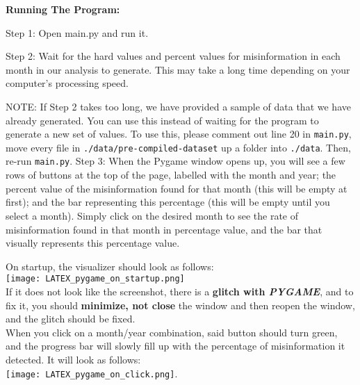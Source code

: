 \documentclass[fontsize=11pt]{article}
\begin{document}
\begin{flushleft}
        \textbf{Running The Program:}

        Step 1: Open main.py and run it.
        \hfill\break

        Step 2: Wait for the hard values and percent values for misinformation in each month in our analysis to generate. This may take a long time depending on your computer's processing speed.
        \hfill\break

        NOTE: If Step 2 takes too long, we have provided a sample of data that we have already generated. You can use this instead of waiting for the program to generate a new set of values. To use this, please comment out line 20 in \texttt{main.py}, move every file in \texttt{./data/pre-compiled-dataset} up a folder into \texttt{./data}. Then, re-run \texttt{main.py}.
        \hfill\break
        \newpage
        Step 3: When the Pygame window opens up, you will see a few rows of buttons at the top of the page, labelled with the month and year; the percent value of the misinformation found for that month (this will be empty at first); and the bar representing this percentage (this will be empty until you select a month). Simply click on the desired month to see the rate of misinformation found in that month in percentage value, and the bar that visually represents this percentage value.
        \hfill\break

        On startup, the visualizer should look as follows:\\
        \texttt{[image: LATEX\_pygame\_on\_startup.png]}\\
        If it does not look like the screenshot, there is a \textbf{glitch with \textit{PYGAME}}, and to fix it, you should \textbf{minimize, not close} the window and then reopen the window, and the glitch should be fixed.\\
        When you click on a month/year combination, said button should turn green, and the progress bar will slowly fill up with the percentage of misinformation it detected. It will look as follows:\\
        \texttt{[image: LATEX\_pygame\_on\_click.png]}.


    \end{flushleft}
\end{document}
